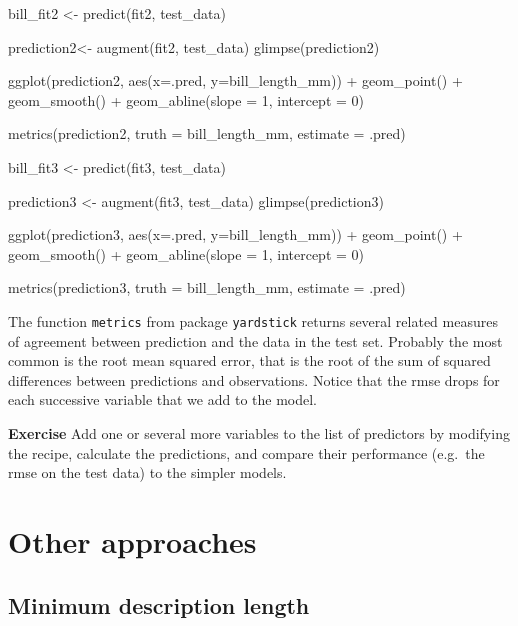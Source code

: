 \documentclass[
  letterpaper,
  DIV=11,
  numbers=noendperiod]{scrreprt}
\newenvironment{Shaded}{\begin{snugshade}}{\end{snugshade}}
\newcommand{\NormalTok}[1]{\textcolor[rgb]{0.00,0.23,0.31}{#1}}
\begin{document}
\begin{Shaded}
\begin{Highlighting}[]
\NormalTok{bill\_fit2 \textless{}{-} predict(fit2, test\_data)}

\NormalTok{prediction2\textless{}{-} augment(fit2, test\_data)}
\NormalTok{glimpse(prediction2)}

\NormalTok{ggplot(prediction2, aes(x=.pred, y=bill\_length\_mm)) + geom\_point() + geom\_smooth() + geom\_abline(slope = 1, intercept = 0)}

\NormalTok{metrics(prediction2, truth = bill\_length\_mm, estimate = .pred)}
\end{Highlighting}
\end{Shaded}

\begin{Shaded}
\begin{Highlighting}[]
\NormalTok{bill\_fit3 \textless{}{-} predict(fit3, test\_data)}

\NormalTok{prediction3 \textless{}{-} augment(fit3, test\_data)}
\NormalTok{glimpse(prediction3)}

\NormalTok{ggplot(prediction3, aes(x=.pred, y=bill\_length\_mm)) + geom\_point() + geom\_smooth() + geom\_abline(slope = 1, intercept = 0)}

\NormalTok{metrics(prediction3, truth = bill\_length\_mm, estimate = .pred)}
\end{Highlighting}
\end{Shaded}

The function \texttt{metrics} from package \texttt{yardstick} returns
several related measures of agreement between prediction and the data in
the test set. Probably the most common is the root mean squared error,
that is the root of the sum of squared differences between predictions
and observations. Notice that the rmse drops for each successive
variable that we add to the model.

\textbf{Exercise} Add one or several more variables to the list of
predictors by modifying the recipe, calculate the predictions, and
compare their performance (e.g.~the rmse on the test data) to the
simpler models.

\section{Other approaches}\label{other-approaches}

\subsection{Minimum description
length}\label{minimum-description-length}
\end{document}
